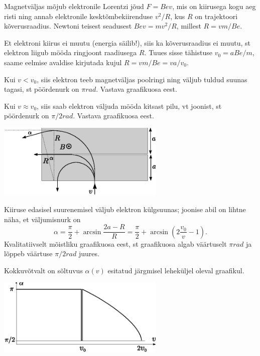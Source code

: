 \documentclass[10pt]{article}
\begin{document}
{%

\solu
Magnetväljas mõjub elektronile Lorentzi jõud $F=Bev$, mis on kiirusega kogu aeg risti ning
annab elektronile kesktõmbekiirenduse $v^2/R$, kus $R$ on trajektoori kõverusraadius. Newtoni teisest seadusest $Bev=mv^2/R$, millest $R=vm/Be$.

Et elektroni kiirus ei muutu (energia säilib!), siis ka kõverusraadius ei muutu, st elektron liigub mööda ringjoont raadiusega $R$.
Tuues sisse tähistuse $v_0=aBe/m$, saame eelmise avaldise kirjutada kujul $R=vm/Be=va/v_0$.

Kui $v< v_0$, siis elektron teeb magnetväljas poolringi ning väljub tuldud suunas tagasi,
st pöördenurk on $\pi\si{rad}$. Vastava graafikuosa eest.

Kui $v\approx v_0$, siis saab elektron väljuda mööda kitsast pilu, vt joonist, st pöördenurk on $\pi/2\si{rad}$. Vastava graafikuosa eest.

\begin{center}
	\includegraphics[width=0.6\textwidth]{2010-v2g-09-elektronlah.eps}
\end{center}

Kiiruse edasisel suurenemisel väljub elektron külgsuunas; joonise abil on lihtne näha, et väljumisnurk on
\[
\alpha =\frac \pi 2 + \arcsin \frac{2a -R}{R}=\frac \pi 2 + \arcsin \left(2\frac {v_0}v -1\right).
\]
Kvalitatiivselt mõistliku graafikuosa eest, st graafikuosa algab väärtuselt $\pi\si{rad}$
ja lõppeb väärtuse $\pi/2\si{rad}$ juures.

Kokkuvõtvalt on sõltuvus $\alpha (v)$ esitatud järgmisel leheküljel oleval graafikul.

\begin{center}
	\includegraphics[width=0.6\textwidth]{2010-v2g-09-elektronlah2.eps}
\end{center}
\probend
\bigskip

}
\end{document}
